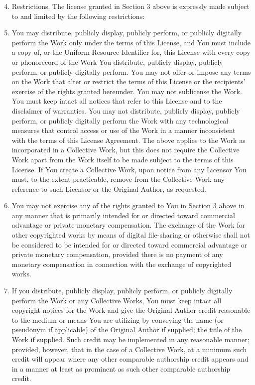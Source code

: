\begin{enumerate}[1.]
\setcounter{enumi}{3}
\item
  Restrictions. The license granted in Section 3 above is expressly
  made subject to and limited by the following restrictions:

\item
  You may distribute, publicly display, publicly perform, or publicly
  digitally perform the Work only under the terms of this License,
  and You must include a copy of, or the Uniform Resource Identifier
  for, this License with every copy or phonorecord of the Work You
  distribute, publicly display, publicly perform, or publicly
  digitally perform. You may not offer or impose any terms on the
  Work that alter or restrict the terms of this License or the
  recipients' exercise of the rights granted hereunder. You may not
  sublicense the Work. You must keep intact all notices that refer to
  this License and to the disclaimer of warranties. You may not
  distribute, publicly display, publicly perform, or publicly
  digitally perform the Work with any technological measures that
  control access or use of the Work in a manner inconsistent with the
  terms of this License Agreement. The above applies to the Work as
  incorporated in a Collective Work, but this does not require the
  Collective Work apart from the Work itself to be made subject to
  the terms of this License. If You create a Collective Work, upon
  notice from any Licensor You must, to the extent practicable,
  remove from the Collective Work any reference to such Licensor or
  the Original Author, as requested.

\item
  You may not exercise any of the rights granted to You in Section 3
  above in any manner that is primarily intended for or directed
  toward commercial advantage or private monetary compensation. The
  exchange of the Work for other copyrighted works by means of
  digital file-sharing or otherwise shall not be considered to be
  intended for or directed toward commercial advantage or private
  monetary compensation, provided there is no payment of any monetary
  compensation in connection with the exchange of copyrighted works.

\item
  If you distribute, publicly display, publicly perform, or publicly
  digitally perform the Work or any Collective Works, You must keep
  intact all copyright notices for the Work and give the Original
  Author credit reasonable to the medium or means You are utilizing
  by conveying the name (or pseudonym if applicable) of the Original
  Author if supplied; the title of the Work if supplied. Such credit
  may be implemented in any reasonable manner; provided, however,
  that in the case of a Collective Work, at a minimum such credit
  will appear where any other comparable authorship credit appears
  and in a manner at least as prominent as such other comparable
  authorship credit.


\end{enumerate}
